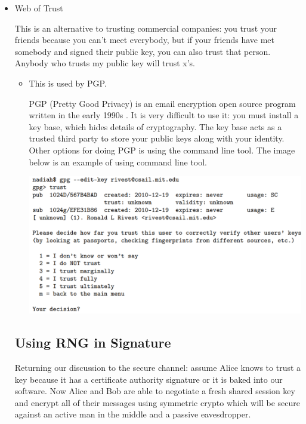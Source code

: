 \documentclass[11pt]{article} %
\begin{document}
\begin{itemize}
  \item  Web of Trust

  This is an alternative to trusting commercial companies: you trust your friends because you can't meet everybody, but if your friends have met somebody and signed their public key, you can also trust that person. Anybody who trusts my public key will trust x’s.
  \begin{itemize}
  \item This is used by PGP.

  PGP (Pretty Good Privacy) is an email encryption open source program written in the early 1990s . It is very difficult to use it: you must install a key base, which hides details of cryptography. The key base acts as a trusted third party to store your public keys along with your identity. Other options for doing PGP is using the command line tool. The image below is an example of using command line tool.
\bigskip

\begin{center}
	\includegraphics[scale=0.55]{./Trust-in-keys2.png}
\end{center}
 
  \end{itemize}
  
  
\newpage
\subsection{Using RNG in Signature}

Returning our discussion to the secure channel: assume Alice knows to trust a key because it has a certificate authority signature or it is baked into our software. Now Alice and Bob are able to negotiate a fresh shared session key and encrypt all of their messages using symmetric crypto which will be secure against an active man in the middle and a passive eavesdropper.\\


\end{itemize}
\end{document}
